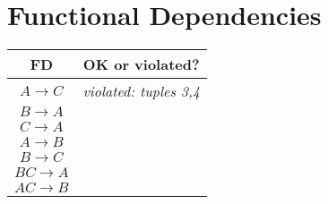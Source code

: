 \section{Functional Dependencies}
\begin{tabular}{|c|c|}
\hline
\textbf{FD} & \textbf{OK or violated?} \\ \hline
$A \rightarrow C$ & \textit{violated: tuples 3,4} \\ \hline
$B \rightarrow A$ &  \\ \hline
$C \rightarrow A$ &  \\ \hline
$A \rightarrow B$ &  \\ \hline
$B \rightarrow C$ &  \\ \hline
$BC \rightarrow A$ &  \\ \hline
$AC \rightarrow B$ &  \\ \hline
\end{tabular}
